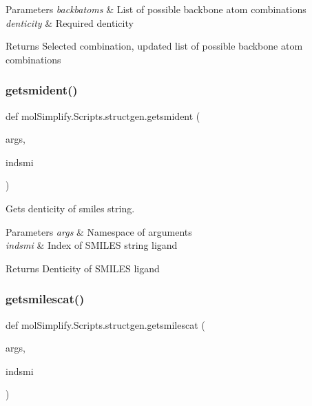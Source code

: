 \begin{DoxyParams}{Parameters}
{\em backbatoms} & List of possible backbone atom combinations \\
\hline
{\em denticity} & Required denticity \\
\hline
\end{DoxyParams}
\begin{DoxyReturn}{Returns}
Selected combination, updated list of possible backbone atom combinations 
\end{DoxyReturn}
\mbox{\label{namespacemolSimplify_1_1Scripts_1_1structgen_ad59becac42b9cc602dfb5ed08452922b}} 
\subsubsection{\texorpdfstring{getsmident()}{getsmident()}}
{\footnotesize\ttfamily def mol\+Simplify.\+Scripts.\+structgen.\+getsmident (\begin{DoxyParamCaption}\item[{}]{args,  }\item[{}]{indsmi }\end{DoxyParamCaption})}



Gets denticity of smiles string. 


\begin{DoxyParams}{Parameters}
{\em args} & Namespace of arguments \\
\hline
{\em indsmi} & Index of S\+M\+I\+L\+ES string ligand \\
\hline
\end{DoxyParams}
\begin{DoxyReturn}{Returns}
Denticity of S\+M\+I\+L\+ES ligand 
\end{DoxyReturn}
\mbox{\label{namespacemolSimplify_1_1Scripts_1_1structgen_a58eaeb979acdfe86a20f086609495725}} 
\subsubsection{\texorpdfstring{getsmilescat()}{getsmilescat()}}
{\footnotesize\ttfamily def mol\+Simplify.\+Scripts.\+structgen.\+getsmilescat (\begin{DoxyParamCaption}\item[{}]{args,  }\item[{}]{indsmi }\end{DoxyParamCaption})}



